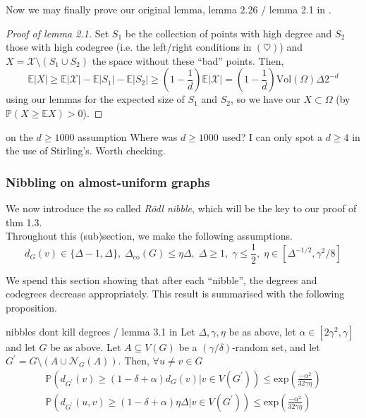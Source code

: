 \documentclass{article}
\begin{document}
Now we may finally prove our original lemma, lemma 2.26 / lemma 2.1 in \cite{campos2023}. 

\begin{proof}[Proof of lemma 2.1]
    Set $S_1$ be the collection of points with high degree and $S_2$ those with high codegree (i.e. the left/right 
    conditions in $(\heartsuit)$) and $X = \mathcal{X} \setminus (S_1 \cup S_2)$ the space without these ``bad'' points.
    Then,
    \[\mathbb{E}|X| \geq \mathbb{E}|\mathcal{X}| - \mathbb{E}|S_1| - \mathbb{E}|S_2| 
    \geq \left(1 - \frac{1}{d}\right)\mathbb{E}|\mathcal{X}| = \left(1 - \frac{1}{d}\right)\text{Vol}(\Omega)\Delta 2^{-d}\]
    using our lemmas for the expected size of $S_1$ and $S_2$, so we have our $X \subset \Omega$ (by $\mathbb{P}(X \geq \mathbb{E}X) > 0$).
\end{proof}

\begin{remark}[]{on the $d \geq 1000$ assumption}
    Where was $d \geq 1000$ used? I can only spot a $d \geq 4$ in the use of Stirling's. Worth checking.
\end{remark}

\subsubsection*{Nibbling on almost-uniform graphs}

We now introduce the so called {\it R\"{o}dl nibble}, which will be the key to our proof of thm 1.3. \\

Throughout this (sub)section, we make the following assumptions. 
\[d_G(v) \in \{\Delta -1, \Delta\}, \; \Delta_{\text{co}}(G) \leq \eta \Delta, \; \Delta \geq 1, \; 
\gamma \leq \frac{1}{2}, \; \eta \in [\Delta^{-1/2}, \gamma^2/8]\]

We spend this section showing that after each ``nibble'', the degrees and codegrees decrease appropriately. This 
result is summarised with the following proposition. 

\begin{proposition}[]{nibbles dont kill degrees / lemma 3.1 in \cite{campos2023}}
    Let $\Delta, \gamma, \eta$ be as above, let $\alpha \in [2\gamma^2, \gamma]$ and let $G$ be as above. Let 
    $A \subseteq V(G)$ be a $(\gamma/\delta)$-random set, and let $G^\prime = G \setminus (A \cup \mathcal{N}_G(A))$.
    Then, $\forall u \neq v \in G$ 
    \begin{align*}
        \mathbb{P}(d_{G^\prime}(v) \geq (1 - \delta + \alpha)d_G(v) | v \in V(G^\prime)) \leq \text{exp}\left(\frac{-\alpha^2}{32\gamma\eta}\right) \\
        \mathbb{P}(d_{G^\prime}(u,v) \geq (1 - \delta + \alpha)\eta\Delta | v \in V(G^\prime)) \leq \text{exp}\left(\frac{-\alpha^2}{32\gamma\eta}\right)
    \end{align*}
\end{proposition}
\end{document}
